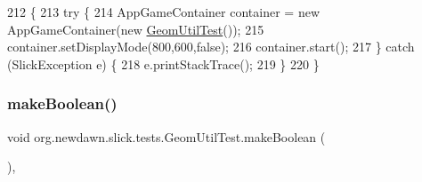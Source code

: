\begin{DoxyCode}
212                                            \{
213         \textcolor{keywordflow}{try} \{
214             AppGameContainer container = \textcolor{keyword}{new} AppGameContainer(\textcolor{keyword}{new} \mbox{\hyperlink{classorg_1_1newdawn_1_1slick_1_1tests_1_1_geom_util_test_ad3f1f62610a3aa16ee201102e729b1e3}{GeomUtilTest}}());
215             container.setDisplayMode(800,600,\textcolor{keyword}{false});
216             container.start();
217         \} \textcolor{keywordflow}{catch} (SlickException e) \{
218             e.printStackTrace();
219         \}
220     \}
\end{DoxyCode}
\mbox{\label{classorg_1_1newdawn_1_1slick_1_1tests_1_1_geom_util_test_a8e0c0356060376434cac5a5740a2ad01}} 
\subsubsection{\texorpdfstring{make\+Boolean()}{makeBoolean()}}
{\footnotesize\ttfamily void org.\+newdawn.\+slick.\+tests.\+Geom\+Util\+Test.\+make\+Boolean (\begin{DoxyParamCaption}{ }\end{DoxyParamCaption})\hspace{0.3cm}{\ttfamily [inline]}, {\ttfamily [private]}}

